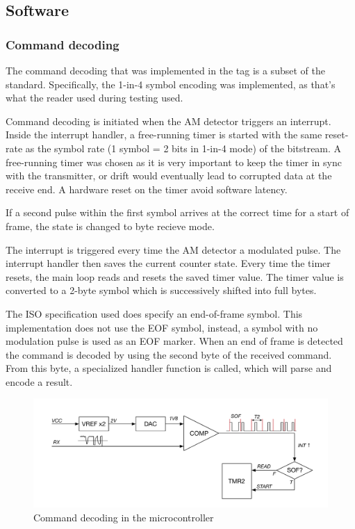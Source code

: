 \subsection{Software}

\subsubsection{Command decoding}
The command decoding that was implemented in the tag is a subset of the standard. Specifically, the
1-in-4 symbol encoding was implemented, as that's what the reader used during testing used.

Command decoding is initiated when the AM detector triggers an interrupt. Inside the interrupt handler,
a free-running timer is started with the same reset-rate as the symbol rate (1 symbol = 2 bits in 1-in-4 mode)
of the bitstream. A free-running timer was chosen as it is very important to keep the timer in sync with
the transmitter, or drift would eventually lead to corrupted data at the receive end. A hardware
reset on the timer avoid software latency.

If a second pulse within the first symbol arrives at the correct time for a start of frame, the state is
changed to byte recieve mode.

The interrupt is triggered every time the AM detector a modulated pulse. The interrupt handler then
saves the current counter state. Every time the timer resets, the main loop reads and resets the saved timer
value. The timer value is converted to a 2-byte symbol which is successively shifted into full bytes.

The ISO specification used does specify an end-of-frame symbol. This implementation does not use
the EOF symbol, instead, a symbol with no modulation pulse is used as an EOF marker.
When an end of frame is detected the command is decoded by using the second byte of the received command.
From this byte, a specialized handler function is called, which will parse and encode a result.

\begin{figure}[h!]
    \centering
    \includegraphics[scale=0.5]{res/RX.pdf}
    \caption{Command decoding in the microcontroller}
    \label{fig:rx}
\end{figure}

